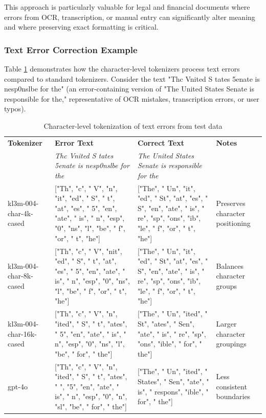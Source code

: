 This approach is particularly valuable for legal and financial documents where errors from OCR, transcription, or manual entry can significantly alter meaning and where preserving exact formatting is critical.

\subsubsection{Text Error Correction Example}

Table \ref{tab:error_example} demonstrates how the character-level tokenizers process text errors compared to standard tokenizers. Consider the text "Thc Vnited S tates 5enate is nesp0nslbe for the" (an error-containing version of "The United States Senate is responsible for the," representative of OCR mistakes, transcription errors, or user typos). 

\begin{table}[htbp]
    \centering
    \small
    \caption{Character-level tokenization of text errors from test data}
    \label{tab:error_example}
    \begin{tabular}{p{3.2cm}p{5.5cm}p{5.5cm}p{2.5cm}}
        \toprule
        \textbf{Tokenizer} & \textbf{Error Text} & \textbf{Correct Text} & \textbf{Notes} \\
        & \textit{Thc Vnited S tates 5enate is nesp0nslbe for the} & \textit{The United States Senate is responsible for the} & \\
        \midrule
        kl3m-004-char-4k-cased & 
        ["Th", "c", " V", "n", "it", "ed", " S", " t", "at", "es", " 5", "en", "ate", 
        " is", " n", "esp", "0", "ns", "l", "be", " f", "or", " t", "he"] & 
        ["The", " Un", "it", "ed", " St", "at", "es", " S", "en", "ate", 
        " is", " re", "sp", "ons", "ib", "le", " f", "or", " t", "he"] & 
        Preserves character positioning \\
        \midrule
        kl3m-004-char-8k-cased & 
        ["Th", "c", " V", "nit", "ed", " S", " t", "at", "es", " 5", "en", "ate", 
        " is", " n", "esp", "0", "ns", "l", "be", " f", "or", " t", "he"] & 
        ["The", " Un", "it", "ed", " St", "at", "es", " S", "en", "ate", 
        " is", " re", "sp", "ons", "ib", "le", " f", "or", " t", "he"] & 
        Balances character groups \\
        \midrule
        kl3m-004-char-16k-cased & 
        ["Th", "c", " V", "n", "ited", " S", " t", "ates", " 5", "en", "ate", 
        " is", " n", "esp", "0", "ns", "l", "be", " for", " the"] & 
        ["The", " Un", "ited", " St", "ates", " Sen", "ate", 
        " is", " re", "sp", "ons", "ible", " for", " the"] & 
        Larger character groupings \\
        \midrule
        gpt-4o & 
        ["Th", "c", " V", "n", "ited", " S", " t", "ates", " ", "5", "en", "ate", 
        " is", " n", "esp", "0", "n", "sl", "be", " for", " the"] & 
        ["The", " Un", "ited", " States", " Sen", "ate", 
        " is", " respons", "ible", " for", " the"] & 
        Less consistent boundaries \\
        \bottomrule
    \end{tabular}
\end{table}

